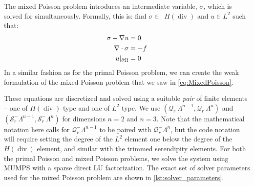 \documentclass[format=acmsmall,screen,timestamp=false,a4paper]{acmart}
\DeclareMathOperator{\Div}{div}
\newcommand{\calQ}{\mathcal{Q}}
\newcommand{\calS}{\mathcal{S}}
\newcommand{\hdiv}{\ensuremath{{H}(\Div ) } }
\begin{document}
The mixed Poisson problem introduces an intermediate variable, $\sigma$, which is solved for simultaneously.
Formally, this is: find $\sigma\in$~\hdiv and $u\in L^2$ such that:
\begin{align}
     \sigma - \nabla u &= 0 \notag \\
     \nabla \cdot \sigma &= -f \notag \\
     u\vert_{\partial \Omega} &= 0 \notag
\end{align}
In a similar fashion as for the primal Poisson problem, we can create the weak formulation of the mixed Poisson problem that we saw in \cref{eq:MixedPoisson}.  %

These equations are discretized and solved using a suitable \textit{pair} of finite elements -- one of \hdiv type and one of $L^2$ type.  We use $(\calQ_r^-\Lambda^{n-1},\calQ_r^-\Lambda^n)$ and $(\calS_r^-\Lambda^{n-1},\calS_r^-\Lambda^n)$ for dimensions $n=2$ and $n=3$.  Note that the mathematical notation here calls for $\mathcal{Q}^-_r \Lambda^{n-1}$ to be paired with $\mathcal{Q}^-_r \Lambda^n$, but the code notation will require setting the degree of the $L^2$ element one below the degree of the \hdiv element, and similar with the trimmed serendipity elements.
For both the primal Poisson and mixed Poisson problems, we solve the system using MUMPS with a sparse direct LU factorization.
The exact set of solver parameters used for the mixed Poisson problem are shown in \cref{lst:solver_parameters}.
\end{document}
